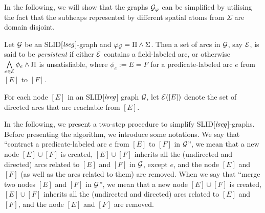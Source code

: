 \documentclass{llncs}
\begin{document}
In the following, we will show that the graphs $\mathcal{G}_\varphi$ can be simplified by utilising the fact that the subheaps represented by different spatial atoms from $\Sigma$ are domain disjoint.

\begin{definition}
Let $\mathcal{G}$ be an SLID[$\mathit{lseg}$]-graph and $\varphi_{\mathcal{G}} = \Pi \wedge \Sigma$. Then a set of arcs in $\mathcal{G}$, say $\mathcal{E}$, is said to be \emph{persistent} if either $\mathcal{E}$ contains a field-labeled arc, or otherwise $\bigwedge \limits_{e \in \mathcal{E}} \phi_e \wedge \Pi$ is unsatisfiable, where $\phi_e := E = F$ for a predicate-labeled arc $e$ from $[E]$ to $[F]$.
\end{definition}
For each node $[E]$ in an SLID[$\mathit{lseg}$] graph $\mathcal{G}$, let $\mathcal{E}([E])$ denote the set of directed arcs that are reachable from $[E]$.


In the following, we present a two-step procedure to simplify SLID[$\mathit{lseg}$]-graphs.
Before presenting the algorithm, we introduce some notations. We say that ``contract a predicate-labeled arc $e$ from $[E]$ to $[F]$ in $\mathcal{G}$'', we mean that a new node $[E] \cup [F]$ is created, $[E] \cup [F]$ inherits all the (undirected and directed) arcs related to $[E]$ and $[F]$ in $\mathcal{G}$, except $e$, and the node $[E]$ and $[F]$ (as well as the arcs related to them) are removed.  When we say that ``merge two nodes $[E]$ and $[F]$ in $\mathcal{G}$'', we mean that a new node $[E] \cup [F]$ is created, $[E] \cup [F]$ inherits all the (undirected and directed) arcs related to $[E]$ and $[F]$, and the node $[E]$ and $[F]$ are removed.
\end{document}
